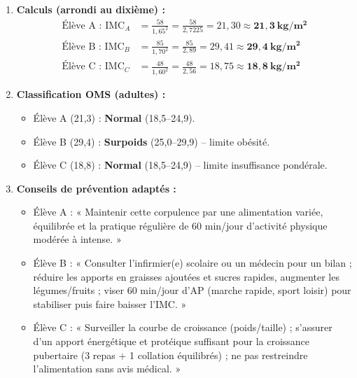 \documentclass[11pt]{article}
\newcounter{popsec}
\newcounter{popsub}
\newcommand{\courssub}[1]{%
  \stepcounter{popsub}%
  \par\vspace{9pt}\noindent{\popxbold\fontsize{11.5}{13}\selectfont\color{popink}{\color{poporange}\thepopsec.\thepopsub}\hspace{6pt}#1}\par\nopagebreak\vspace{4pt}
}
\begin{document}
\begin{corrige}
\begin{enumerate}
\item \textbf{Calculs (arrondi au dixième) :}
\begin{align*}
\text{Élève A : } \text{IMC}_A &= \frac{58}{1,65^2} = \frac{58}{2,7225} = 21,30 \approx \mathbf{21,3\ kg/m^2} \\
\text{Élève B : } \text{IMC}_B &= \frac{85}{1,70^2} = \frac{85}{2,89} = 29,41 \approx \mathbf{29,4\ kg/m^2} \\
\text{Élève C : } \text{IMC}_C &= \frac{48}{1,60^2} = \frac{48}{2,56} = 18,75 \approx \mathbf{18,8\ kg/m^2}
\end{align*}
\item \textbf{Classification OMS (adultes) :}
\begin{itemize}
\item Élève A (21,3) : \textbf{Normal} (18,5--24,9).
\item Élève B (29,4) : \textbf{Surpoids} (25,0--29,9) -- limite obésité.
\item Élève C (18,8) : \textbf{Normal} (18,5--24,9) -- limite insuffisance pondérale.
\end{itemize}
\item \textbf{Conseils de prévention adaptés :}
\begin{itemize}
\item Élève A : « Maintenir cette corpulence par une alimentation variée, équilibrée et la pratique régulière de 60 min/jour d'activité physique modérée à intense. »
\item Élève B : « Consulter l'infirmier(e) scolaire ou un médecin pour un bilan ; réduire les apports en graisses ajoutées et sucres rapides, augmenter les légumes/fruits ; viser 60 min/jour d'AP (marche rapide, sport loisir) pour stabiliser puis faire baisser l'IMC. »
\item Élève C : « Surveiller la courbe de croissance (poids/taille) ; s'assurer d'un apport énergétique et protéique suffisant pour la croissance pubertaire (3 repas + 1 collation équilibrés) ; ne pas restreindre l'alimentation sans avis médical. »
\end{itemize}
\end{enumerate}
\end{corrige}

\courssub{Je m'entraîne}
\end{document}
